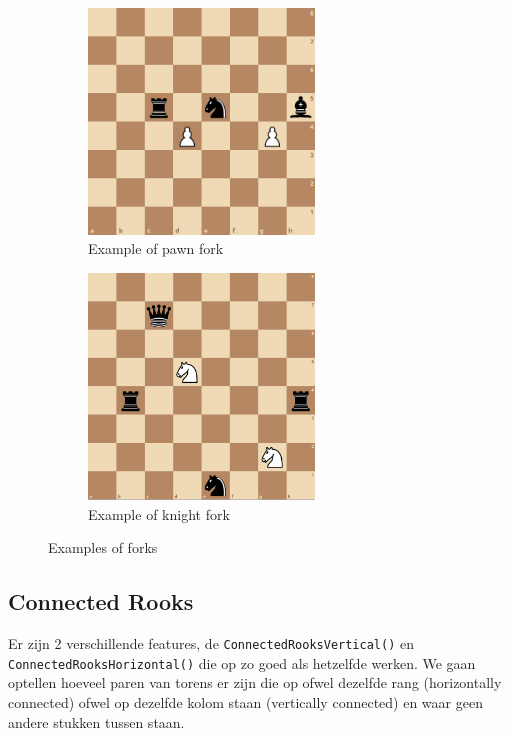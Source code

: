 \documentclass[a4paper,openany]{uantwerpenassignment}
\newcommand{\codeword}[1]{
    \colorbox{code}{\texttt{\textcolor{codetext}{#1}}}
}
\begin{document}
\begin{figure}[h]
    \centering
    \begin{subfigure}{.4\textwidth}
        \includegraphics[width=170pt]{images/pawnFork.png}
        \caption{Example of pawn fork}
        \label{fig:pawnFork}
    \end{subfigure}
    \begin{subfigure}{.4\textwidth}
        \includegraphics[width=170pt]{images/knightFork.png}
        \caption{Example of knight fork}
        \label{fig:knightFork}
    \end{subfigure}
    \caption{Examples of forks}
\end{figure}



\subsection{Connected Rooks}
\label{connectedRooks}
Er zijn 2 verschillende features, de \codeword{ConnectedRooksVertical()} en \codeword{ConnectedRooksHorizontal()} die op zo goed als hetzelfde werken. We gaan optellen hoeveel paren van torens er zijn die op ofwel dezelfde rang (horizontally connected) ofwel op dezelfde kolom staan (vertically connected) en waar geen andere stukken tussen staan.
\end{document}

